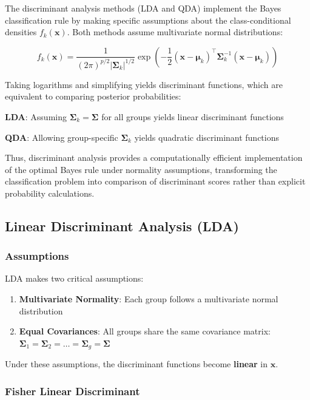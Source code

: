 \documentclass[
]{article}
\begin{document}
The discriminant analysis methods (LDA and QDA) implement the Bayes
classification rule by making specific assumptions about the
class-conditional densities \(f_{k}\left( \mathbf{x} \right)\). Both
methods assume multivariate normal distributions:

\[f_{k}\left( \mathbf{x} \right) = \frac{1}{(2\pi)^{p/2}|\mathbf{\Sigma}_{k}|^{1/2}}\exp( - \frac{1}{2}\left( \mathbf{x} - \mathbf{\mu}_{k} \right)^{\top}\mathbf{\Sigma}_{k}^{- 1}\left( \mathbf{x} - \mathbf{\mu}_{k} \right))\]

Taking logarithms and simplifying yields discriminant functions, which
are equivalent to comparing posterior probabilities:

\textbf{LDA}: Assuming \(\mathbf{\Sigma}_{k} = \mathbf{\Sigma}\) for all
groups yields linear discriminant functions

\textbf{QDA}: Allowing group-specific \(\mathbf{\Sigma}_{k}\) yields
quadratic discriminant functions

Thus, discriminant analysis provides a computationally efficient
implementation of the optimal Bayes rule under normality assumptions,
transforming the classification problem into comparison of discriminant
scores rather than explicit probability calculations.

\subsection{Linear Discriminant Analysis (LDA)}

\subsubsection{Assumptions}

LDA makes two critical assumptions:

\begin{enumerate}
\item
  \textbf{Multivariate Normality}: Each group follows a multivariate
  normal distribution
\item
  \textbf{Equal Covariances}: All groups share the same covariance
  matrix:
  \(\mathbf{\Sigma}_{1} = \mathbf{\Sigma}_{2} = \ldots = \mathbf{\Sigma}_{g} = \mathbf{\Sigma}\)
\end{enumerate}

Under these assumptions, the discriminant functions become
\textbf{linear} in \(\mathbf{x}\).

\subsubsection{Fisher Linear Discriminant}
\end{document}
